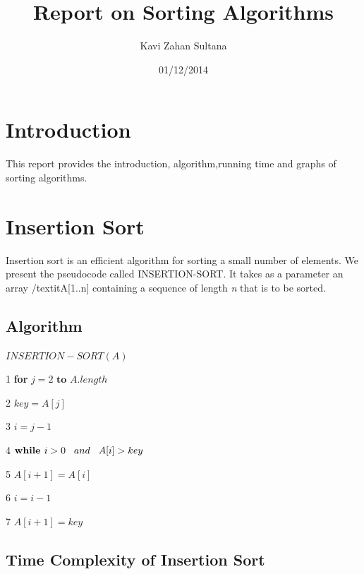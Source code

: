 \documentclass[12 pt,a4paper]{report}
\begin{document}
\title{\sffamily\huge\textbf{Report on Sorting Algorithms}}
\author{Kavi Zahan Sultana}
\date{01/12/2014}
\maketitle


\newpage

\tableofcontents

\newpage

\section{Introduction}

This report provides the introduction, algorithm,running time and graphs of sorting algorithms.

\section{Insertion Sort}

Insertion sort is an efficient algorithm for sorting a small number of elements. We present the pseudocode called INSERTION-SORT.
It takes as a parameter an array /textit{A[1..n]}  containing a sequence of length \textit{n} that is to be sorted.

\subsection{Algorithm}

$INSERTION-SORT(A)$

1   \textbf{for}  $j=2   \textbf{   to  }   A.length$

2    \hspace{1cm}$ key=A[j] $

3     \hspace{1cm}$i=j-1$

4     \hspace{1cm}$\textbf{while  }i>0\hspace{0.3cm}and \hspace{0.3cm} A[i]>key$

5     \hspace{1.5cm}$A[i+1]=A[i]$

6     \hspace{1.5cm}$i=i-1$

7     \hspace{1cm}$A[i+1]=key$


\subsection{ Time Complexity  of  Insertion  Sort}
\end{document}
